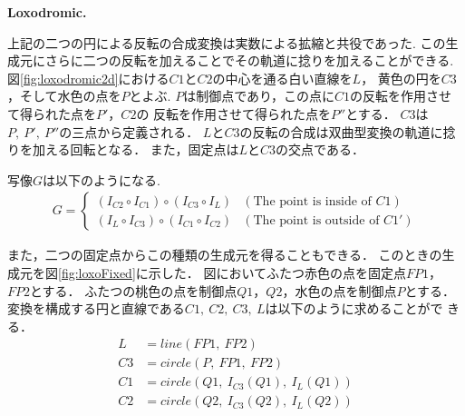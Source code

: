 \noindent\textbf{Loxodromic.}

上記の二つの円による反転の合成変換は実数による拡縮と共役であった.
この生成元にさらに二つの反転を加えることでその軌道に捻りを加えることができる.
図\ref{fig:loxodromic2d}における$C1$と$C2$の中心を通る白い直線を$L$，
黄色の円を$C3$，そして水色の点を$P$とよぶ.
$P$は制御点であり，この点に$C1$の反転を作用させて得られた点を$P'$，$C2$の
反転を作用させて得られた点を$P''$とする．
$C3$は$P,~P',~P''$の三点から定義される．
$L$と$C3$の反転の合成は双曲型変換の軌道に捻りを加える回転となる．
また，固定点は$L$と$C3$の交点である．

写像$G$は以下のようになる.
\begin{align*}
G =
\begin{cases}
 (I_{C2} \circ I_{C1}) \circ (I_{C3} \circ I_L) & (\text{The point is inside of } C1) \\
 (I_L \circ I_{C3}) \circ (I_{C1} \circ I_{C2}) & (\text{The point is outside of }C1')
\end{cases}
\end{align*}

また，二つの固定点からこの種類の生成元を得ることもできる．
このときの生成元を図\ref{fig:loxoFixed}に示した．
図においてふたつ赤色の点を固定点$FP1$，$FP2$とする．
ふたつの桃色の点を制御点$Q1$，$Q2$，水色の点を制御点$P$とする．
変換を構成する円と直線である$C1,~C2,~C3,~L$は以下のように求めることがで
きる．
\begin{align*}
 L &= line(FP1,~FP2)\\
 C3 &= circle(P,~FP1,~FP2)\\
 C1 &= circle(Q1,~I_{C3}(Q1),~I_{L}(Q1))\\
 C2 &= circle(Q2,~I_{C3}(Q2),~I_{L}(Q2))
\end{align*}

